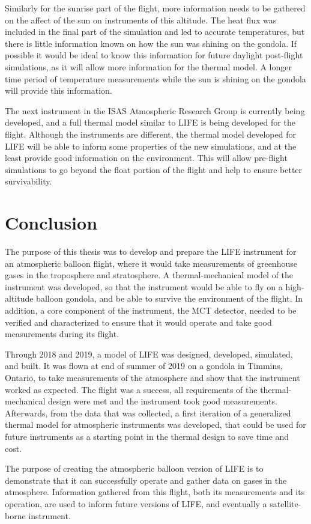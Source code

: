 Similarly for the sunrise part of the flight, more information needs to be gathered on the affect of the sun on instruments of this altitude. The heat flux was included in the final part of the simulation and led to accurate temperatures, but there is little information known on how the sun was shining on the gondola. If possible it would be ideal to know this information for future daylight post-flight simulations, as it will allow more information for the thermal model. A longer time period of temperature measurements while the sun is shining on the gondola will provide this information.

The next instrument in the ISAS Atmospheric Research Group is currently being developed, and a full thermal model similar to LIFE is being developed for the flight. Although the instruments are different, the thermal model developed for LIFE will be able to inform some properties of the new simulations, and at the least provide good information on the environment. This will allow pre-flight simulations to go beyond the float portion of the flight and help to ensure better survivability.

\section{Conclusion}
The purpose of this thesis was to develop and prepare the LIFE instrument for an atmospheric balloon flight, where it would take measurements of greenhouse gases in the troposphere and stratosphere. A thermal-mechanical model of the instrument was developed, so that the instrument would be able to fly on a high-altitude balloon gondola, and be able to survive the environment of the flight. In addition, a core component of the instrument, the MCT detector, needed to be verified and characterized to ensure that it would operate and take good measurements during its flight.

Through 2018 and 2019, a model of LIFE was designed, developed, simulated, and built. It was flown at end of summer of 2019 on a gondola in Timmins, Ontario, to take measurements of the atmosphere and show that the instrument worked as expected. The flight was a success, all requirements of the thermal-mechanical design were met and the instrument took good measurements. Afterwards, from the data that was collected, a first iteration of a generalized thermal model for atmospheric instruments was developed, that could be used for future instruments as a starting point in the thermal design to save time and cost.

The purpose of creating the atmospheric balloon version of LIFE is to demonstrate that it can successfully operate and gather data on gases in the atmosphere. Information gathered from this flight, both its measurements and its operation, are used to inform future versions of LIFE, and eventually a satellite-borne instrument. 